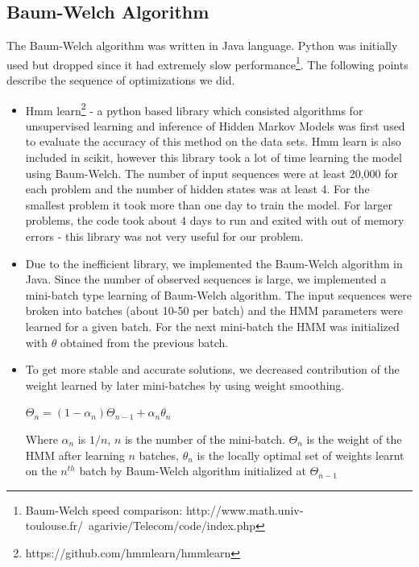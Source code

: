 \documentclass[letterpaper]{article}
\begin{document}
\subsection{Baum-Welch Algorithm}

The Baum-Welch algorithm was written in Java language. Python was initially used but dropped since it had extremely slow performance\footnote{Baum-Welch speed comparison: http://www.math.univ-toulouse.fr/~agarivie/Telecom/code/index.php}. The following points describe the sequence of optimizations we did.

\begin{itemize}
\item Hmm learn\footnote{https://github.com/hmmlearn/hmmlearn} - a python based library which consisted algorithms for unsupervised learning and inference of Hidden Markov Models was first used to evaluate the accuracy of this method on the data sets. Hmm learn is also included in scikit, however this library took a lot of time learning the model using Baum-Welch. The number of input sequences were at least 20,000 for each problem and the number of hidden states was at least 4. For the smallest problem it took more than one day to train the model. For larger problems, the code took about 4 days to run and exited with out of memory errors - this library was not very useful for our problem.

\item Due to the inefficient library, we implemented the Baum-Welch algorithm in Java. Since the number of observed sequences is large, we implemented a mini-batch type learning of Baum-Welch algorithm. The input sequences were broken into batches (about 10-50 per batch) and the HMM parameters were learned for a given batch. For the next mini-batch the HMM was initialized with $\theta$ obtained from the previous batch.

\item To get more stable and accurate solutions, we decreased contribution of the weight learned by later mini-batches by using weight smoothing.

\begin{center}
$\Theta_{n} = (1-\alpha_{n})\Theta_{n-1} + \alpha_{n} \theta_{n}$
\end{center}

Where $\alpha_{n}$ is $1/n$, $n$ is the number of the mini-batch. $\Theta_{n}$ is the weight of the HMM after learning $n$ batches, $\theta_{n}$ is the locally optimal set of weights learnt on the $n^{th}$ batch by Baum-Welch algorithm initialized at $\Theta_{n-1}$ 



\end{itemize}
\end{document}
